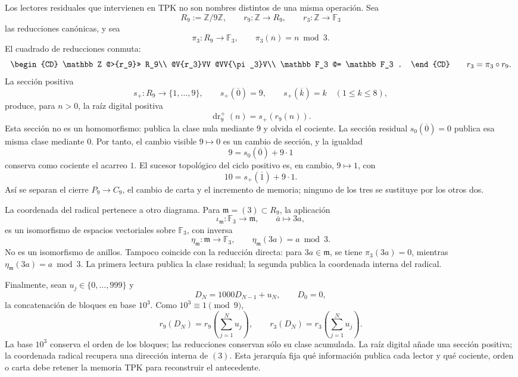 Los lectores residuales que intervienen en TPK no son nombres distintos de
una misma operación. Sea
\[
 R_9:=\mathbb Z/9\mathbb Z,
 \qquad
 r_9:\mathbb Z\longrightarrow R_9,
 \qquad
 r_3:\mathbb Z\longrightarrow\mathbb F_3
\]
las reducciones canónicas, y sea
\[
 \pi_3:R_9\longrightarrow\mathbb F_3,
 \qquad \pi_3(\overline n)=n\bmod3.
\]
El cuadrado de reducciones conmuta:
\begin{equation}
\begin{CD}
 \mathbb Z @>{r_9}>> R_9\\
 @V{r_3}VV @VV{\pi_3}V\\
 \mathbb F_3 @= \mathbb F_3 .
\end{CD}
\qquad
 r_3=\pi_3\circ r_9.
\label{eq:diagrama-reducciones-9-3-rev3}
\end{equation}
La sección positiva
\[
 s_+:R_9\longrightarrow\{1,\ldots,9\},
 \qquad
 s_+(\overline0)=9,
 \qquad
 s_+(\overline k)=k\quad(1\le k\le8),
\]
produce, para \(n>0\), la raíz digital positiva
\[
 \operatorname{dr}_9^+(n)=s_+(r_9(n)).
\]
Esta sección no es un homomorfismo: publica la clase nula mediante \(9\) y
olvida el cociente. La sección residual \(s_0(\overline0)=0\) publica esa
misma clase mediante \(0\). Por tanto, el cambio visible \(9\mapsto0\) es un
cambio de sección, y la igualdad
\[
 9=s_0(\overline0)+9\cdot1
\]
conserva como cociente el acarreo \(1\). El sucesor topológico del ciclo
positivo es, en cambio, \(9\mapsto1\), con
\[
 10=s_+(\overline1)+9\cdot1.
\]
Así se separan el cierre \(P_9\to C_9\), el cambio de carta y el incremento
de memoria; ninguno de los tres se sustituye por los otros dos.

La coordenada del radical pertenece a otro diagrama. Para
\(\mathfrak m=(3)\subset R_9\), la aplicación
\[
 \iota_{\mathfrak m}:\mathbb F_3\longrightarrow\mathfrak m,
 \qquad \overline a\longmapsto3a,
\]
es un isomorfismo de espacios vectoriales sobre \(\mathbb F_3\), con inversa
\begin{equation}
 \eta_{\mathfrak m}:\mathfrak m\longrightarrow\mathbb F_3,
 \qquad
 \eta_{\mathfrak m}(3a)=a\bmod3.
 \label{eq:coordenada-radical-compatibilidad-rev3}
\end{equation}
No es un isomorfismo de anillos. Tampoco coincide con la reducción directa:
para \(3a\in\mathfrak m\), se tiene \(\pi_3(3a)=0\), mientras
\(\eta_{\mathfrak m}(3a)=a\bmod3\). La primera lectura publica la clase
residual; la segunda publica la coordenada interna del radical.

Finalmente, sean \(u_j\in\{0,\ldots,999\}\) y
\[
 D_N=1000D_{N-1}+u_N,
 \qquad D_0=0,
\]
la concatenación de bloques en base \(10^3\). Como \(10^3\equiv1\pmod9\),
\begin{equation}
 r_9(D_N)=r_9\!\left(\sum_{j=1}^{N}u_j\right),
 \qquad
 r_3(D_N)=r_3\!\left(\sum_{j=1}^{N}u_j\right).
 \label{eq:compatibilidad-base-mil-reducciones-rev3}
\end{equation}
La base \(10^3\) conserva el orden de los bloques; las reducciones conservan sólo
su clase acumulada. La raíz digital añade una sección positiva; la coordenada
radical recupera una dirección interna de \((3)\). Esta jerarquía fija qué
información publica cada lector y qué cociente, orden o carta debe retener la
memoria TPK para reconstruir el antecedente.

